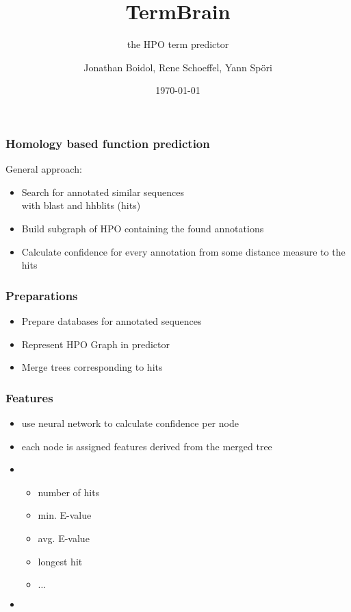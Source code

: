 \documentclass{beamer}
\author{Jonathan Boidol, Rene Schoeffel, Yann Sp\"ori}
\title{TermBrain}
\subtitle{the HPO term predictor}
\date{\today}
\begin{document}
\begin{frame}
\maketitle
 
\end{frame}

\begin{frame}
  \frametitle{Homology based function prediction}
  General approach:
  \begin{itemize}
  	\item Search for annotated similar sequences\\with blast and hhblits (hits)
  	\item Build subgraph of HPO containing the found annotations
  	\item Calculate confidence for every annotation from some distance measure to the hits
  \end{itemize}

\end{frame}

\begin{frame}
	\frametitle{Preparations}
		\begin{itemize}
			\item Prepare databases for annotated sequences
			\item Represent HPO Graph in predictor
			\item Merge trees corresponding to hits
		\end{itemize}
\end{frame}

\begin{frame}
	\frametitle{Features}
	\begin{itemize}
		\item use neural network to calculate confidence per node
		\item each node is assigned features derived from the merged tree
		\item[] \begin{itemize}
					\item number of hits
					\item min. E-value	
					\item avg. E-value \qquad[3, 0.0074, 0.45, 84, $\dots$]
					\item longest hit
					\item $\dots$ 
				\end{itemize}
				\item[] 
	\end{itemize}
\end{frame}
\end{document}
